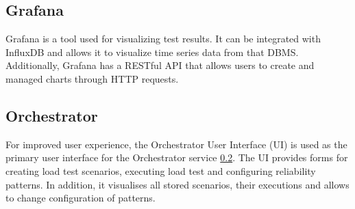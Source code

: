 \subsection{Grafana}\label{subsec:grafana}
Grafana is a tool used for visualizing test results. It can be integrated with InfluxDB and allows it to visualize time series data from that DBMS. Additionally, Grafana has a RESTful API that allows users to create and managed charts through HTTP requests.

\subsection{Orchestrator}\label{subsec:orchestrator}
For improved user experience, the Orchestrator User Interface (UI) is used as the primary user interface for the Orchestrator service \ref{subsec:orchestrator}. The UI provides forms for creating load test scenarios, executing load test and configuring reliability patterns. In addition, it visualises all stored scenarios, their executions and allows to change configuration of patterns.